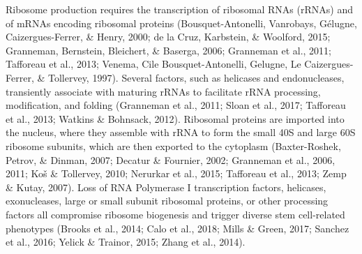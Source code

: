 \documentclass[12pt,twoside]{reedthesis}
\begin{document}
Ribosome production requires the transcription of ribosomal RNAs (rRNAs)
and of mRNAs encoding ribosomal proteins (Bousquet-Antonelli, Vanrobays, Gélugne, Caizergues-Ferrer, \& Henry, 2000; de la Cruz, Karbstein, \& Woolford, 2015; Granneman, Bernstein, Bleichert, \& Baserga, 2006; Granneman et al., 2011; Tafforeau et al., 2013; Venema, Cile Bousquet-Antonelli, Gelugne, Le Caizergues-Ferrer, \& Tollervey, 1997). Several factors, such
as helicases and endonucleases, transiently associate with maturing
rRNAs to facilitate rRNA processing, modification, and folding
(Granneman et al., 2011; Sloan et al., 2017; Tafforeau et al., 2013; Watkins \& Bohnsack, 2012).
Ribosomal proteins are imported into the nucleus, where they assemble
with rRNA to form the small 40S and large 60S ribosome subunits, which
are then exported to the cytoplasm (Baxter-Roshek, Petrov, \& Dinman, 2007; Decatur \& Fournier, 2002; Granneman et al., 2006, 2011; Koš \& Tollervey, 2010; Nerurkar et al., 2015; Tafforeau et al., 2013; Zemp \& Kutay, 2007). Loss of RNA Polymerase I transcription factors, helicases,
exonucleases, large or small subunit ribosomal proteins, or other
processing factors all compromise ribosome biogenesis and trigger
diverse stem cell-related phenotypes (Brooks et al., 2014; Calo et al., 2018; Mills \& Green, 2017; Sanchez et al., 2016; Yelick \& Trainor, 2015; Zhang et al., 2014).
\end{document}
